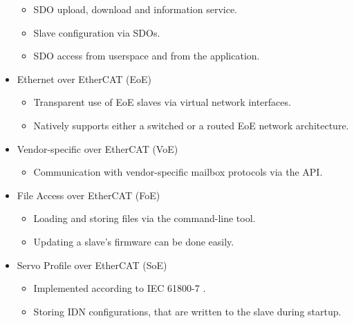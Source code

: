 \documentclass[a4paper,12pt,BCOR6mm,bibtotoc,idxtotoc]{scrbook}
\begin{document}
\begin{itemize}
\begin{itemize}
  \item SDO upload, download and information service.

  \item Slave configuration via SDOs.

  \item SDO access from userspace and from the application.

  \end{itemize}

\item Ethernet over EtherCAT (EoE)

  \begin{itemize}

  \item Transparent use of EoE slaves via virtual network interfaces.

  \item Natively supports either a switched or a routed EoE network
  architecture.

  \end{itemize}

\item Vendor-specific over EtherCAT (VoE)

  \begin{itemize}

  \item Communication with vendor-specific mailbox protocols via the API.

  \end{itemize}

\item File Access over EtherCAT (FoE)

  \begin{itemize}

  \item Loading and storing files via the command-line tool.

  \item Updating a slave's firmware can be done easily.

  \end{itemize}

\item Servo Profile over EtherCAT (SoE)

  \begin{itemize}

  \item Implemented according to IEC 61800-7 \cite{soespec}.

  \item Storing IDN configurations, that are written to the slave during
  startup.


\end{itemize}
\end{itemize}
\end{document}
